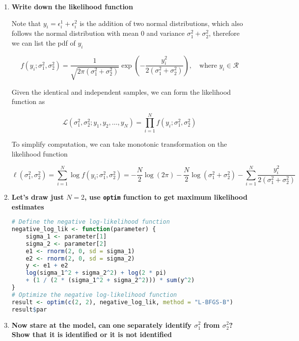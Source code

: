 \documentclass[11pt]{article}
\begin{document}
        \begin{enumerate}
    
            \item{\bf Write down the likelihood function}

                Note that $y_i = \epsilon_i^1 + \epsilon_i^2$ is the addition of two normal distributions, which also follows the normal distribution with mean $0$ and variance $\sigma_1^2+\sigma_2^2$, therefore we can list the pdf of $y_i$

                \[
                    f(y_i; \sigma_1^2, \sigma_2^2) = \frac{1}{\sqrt{2\pi(\sigma_1^2 + \sigma_2^2)}} \exp(-\frac{y_i^2}{2(\sigma_1^2 + \sigma_2^2)}), \quad\text{where } y_i \in \mathcal{R}
                \]

                Given the identical and independent samples, we can form the likelihood function as

                \[
                    \mathcal{L}(\sigma_1^2, \sigma_2^2; y_1, y_2, \ldots, y_N) = \prod_{i=1}^{N} f(y_i; \sigma_1^2, \sigma_2^2)
                \]

                To simplify computation, we can take monotonic transformation on the likelihood function

                \[
                    \ell(\sigma_1^2, \sigma_2^2) = \sum_{i=1}^{N} \log f(y_i; \sigma_1^2, \sigma_2^2) = -\frac{N}{2} \log(2\pi) - \frac{N}{2} \log(\sigma_1^2 + \sigma_2^2) - \sum_{i=1}^{N}\frac{y_i^2}{2(\sigma_1^2 + \sigma_2^2)}
                \]

            \item{\bf Let's draw just $N=2$, use \texttt{optim} function to get maximum likelihood estimates }
            
                \begin{lstlisting}[language=R]
# Define the negative log-likelihood function
negative_log_lik <- function(parameter) {
    sigma_1 <- parameter[1]
    sigma_2 <- parameter[2]
    e1 <- rnorm(2, 0, sd = sigma_1)
    e2 <- rnorm(2, 0, sd = sigma_2)
    y <- e1 + e2
    log(sigma_1^2 + sigma_2^2) + log(2 * pi)
    + (1 / (2 * (sigma_1^2 + sigma_2^2))) * sum(y^2)
}
# Optimize the negative log-likelihood function
result <- optim(c(2, 2), negative_log_lik, method = "L-BFGS-B")
result$par
                \end{lstlisting}
                

            \item{\bf Now stare at the model, can one separately identify $\sigma_1^2$ from $\sigma_2^2$? Show that it is identified or it is not identified}


\end{enumerate}
\end{document}
